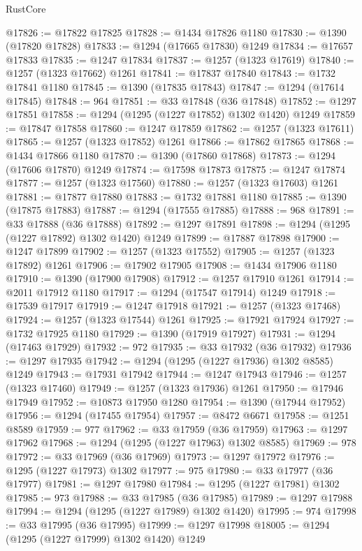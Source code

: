 \begin{lexlean}{RustCore}
\begin{coremodule}
@17826 := @17822 @17825
@17828 := @1434 @17826 @1180
@17830 := @1390 (@17820 @17828)
@17833 := @1294 (@17665 @17830) @1249
@17834 := @17657 @17833
@17835 := @1247 @17834
@17837 := @1257 (@1323 @17619)
@17840 := @1257 (@1323 @17662) @1261
@17841 := @17837 @17840
@17843 := @1732 @17841 @1180
@17845 := @1390 (@17835 @17843)
@17847 := @1294 (@17614 @17845)
@17848 := 964
@17851 := @33 @17848 (@36 @17848)
@17852 := @1297 @17851
@17858 := @1294 (@1295 (@1227 @17852) @1302 @1420) @1249
@17859 := @17847 @17858
@17860 := @1247 @17859
@17862 := @1257 (@1323 @17611)
@17865 := @1257 (@1323 @17852) @1261
@17866 := @17862 @17865
@17868 := @1434 @17866 @1180
@17870 := @1390 (@17860 @17868)
@17873 := @1294 (@17606 @17870) @1249
@17874 := @17598 @17873
@17875 := @1247 @17874
@17877 := @1257 (@1323 @17560)
@17880 := @1257 (@1323 @17603) @1261
@17881 := @17877 @17880
@17883 := @1732 @17881 @1180
@17885 := @1390 (@17875 @17883)
@17887 := @1294 (@17555 @17885)
@17888 := 968
@17891 := @33 @17888 (@36 @17888)
@17892 := @1297 @17891
@17898 := @1294 (@1295 (@1227 @17892) @1302 @1420) @1249
@17899 := @17887 @17898
@17900 := @1247 @17899
@17902 := @1257 (@1323 @17552)
@17905 := @1257 (@1323 @17892) @1261
@17906 := @17902 @17905
@17908 := @1434 @17906 @1180
@17910 := @1390 (@17900 @17908)
@17912 := @1257 @17910 @1261
@17914 := @2011 @17912 @1180
@17917 := @1294 (@17547 @17914) @1249
@17918 := @17539 @17917
@17919 := @1247 @17918
@17921 := @1257 (@1323 @17468)
@17924 := @1257 (@1323 @17544) @1261
@17925 := @17921 @17924
@17927 := @1732 @17925 @1180
@17929 := @1390 (@17919 @17927)
@17931 := @1294 (@17463 @17929)
@17932 := 972
@17935 := @33 @17932 (@36 @17932)
@17936 := @1297 @17935
@17942 := @1294 (@1295 (@1227 @17936) @1302 @8585) @1249
@17943 := @17931 @17942
@17944 := @1247 @17943
@17946 := @1257 (@1323 @17460)
@17949 := @1257 (@1323 @17936) @1261
@17950 := @17946 @17949
@17952 := @10873 @17950 @1280
@17954 := @1390 (@17944 @17952)
@17956 := @1294 (@17455 @17954)
@17957 := @8472 @6671
@17958 := @1251 @8589
@17959 := 977
@17962 := @33 @17959 (@36 @17959)
@17963 := @1297 @17962
@17968 := @1294 (@1295 (@1227 @17963) @1302 @8585)
@17969 := 978
@17972 := @33 @17969 (@36 @17969)
@17973 := @1297 @17972
@17976 := @1295 (@1227 @17973) @1302
@17977 := 975
@17980 := @33 @17977 (@36 @17977)
@17981 := @1297 @17980
@17984 := @1295 (@1227 @17981) @1302
@17985 := 973
@17988 := @33 @17985 (@36 @17985)
@17989 := @1297 @17988
@17994 := @1294 (@1295 (@1227 @17989) @1302 @1420)
@17995 := 974
@17998 := @33 @17995 (@36 @17995)
@17999 := @1297 @17998
@18005 := @1294 (@1295 (@1227 @17999) @1302 @1420) @1249

\end{coremodule}
\end{lexlean}
